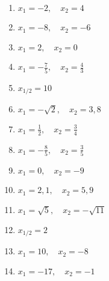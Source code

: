 \newpage
\begin{Answer}[ref=produktformNullstellenA1]
	
	\begin{minipage}{\textwidth}
		\begin{minipage}{0.5\textwidth}
			\begin{enumerate}[label=\alph*)]
				\item \(x_1=-2,\quad x_2=4\)
				\item \(x_1=-8,\quad x_2=-6\)
				\item \(x_1=2,\quad x_2=0\)
				\item \(x_1=-\frac{7}{5},\quad x_2=\frac{4}{3}\)
				\item \(x_{1/2}=10\)
				\item \(x_1=-\sqrt{2},\quad x_2=3,8\)
				\item \(x_1=\frac{1}{2},\quad x_2=\frac{3}{4}\)
			\end{enumerate}
		\end{minipage}%
		\begin{minipage}{0.5\textwidth}
			\begin{enumerate}[label=\alph*)]
				\setcounter{enumi}{7}
				\item \(x_1=-\frac{8}{5},\quad x_2=\frac{3}{5}\)
				\item \(x_1=0,\quad x_2=-9\)
				\item \(x_1=2,1,\quad x_2=5,9\)
				\item \(x_1=\sqrt{5},\quad x_2=-\sqrt{11}\)
				\item \(x_{1/2}=2\)
				\item \(x_1=10,\quad x_2=-8\)
				\item \(x_1=-17,\quad x_2=-1\)
			\end{enumerate}
		\end{minipage}%
	\end{minipage}%
\end{Answer}
